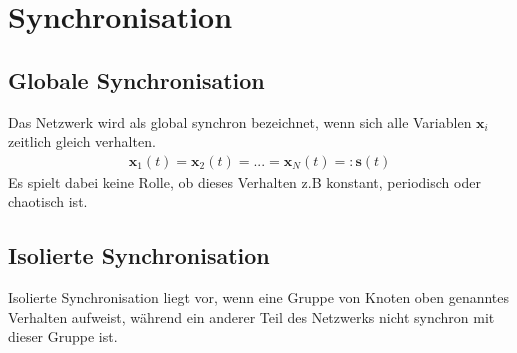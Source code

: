 \section{Synchronisation}
\subsection*{Globale Synchronisation}
Das Netzwerk wird als global synchron bezeichnet, wenn sich alle Variablen $\boldsymbol{x}_i$ zeitlich gleich verhalten.
\begin{align*}
\boldsymbol{x}_1(t)=\boldsymbol{x}_2(t)=...=\boldsymbol{x}_N(t)=:\boldsymbol{s}(t)
\end{align*}
Es spielt dabei keine Rolle, ob dieses Verhalten z.B konstant, periodisch oder chaotisch ist.

\subsection*{Isolierte Synchronisation}
Isolierte Synchronisation liegt vor, wenn eine Gruppe von Knoten oben genanntes Verhalten aufweist, während ein anderer Teil des Netzwerks nicht synchron mit dieser Gruppe ist.

